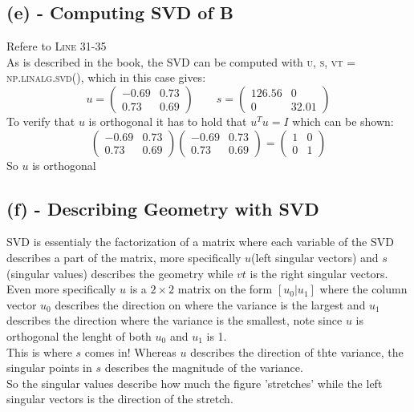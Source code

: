 \documentclass[12pt]{article}
\begin{document}
\subsection*{(e) - Computing SVD of B}
Refere to \textsc{Line 31-35}\\
As is described in the book,  the SVD can be computed with \textsc{u, s, vt = np.linalg.svd()}, which in this case gives:
\[
u = \begin{pmatrix}
   -0.69 & 0.73 \\
    0.73 & 0.69
\end{pmatrix} \qquad s = \begin{pmatrix}
   126.56 & 0 \\
   0 & 32.01
\end{pmatrix}
\]
To verify that $u$ is orthogonal it has to hold that $u^Tu = I$
which can be shown:
\[
\begin{pmatrix}
   -0.69 & 0.73 \\
    0.73 & 0.69
\end{pmatrix}
 \begin{pmatrix}
   -0.69 & 0.73 \\
    0.73 & 0.69
\end{pmatrix} 
= \begin{pmatrix}
   1 & 0 \\
    0 & 1
\end{pmatrix}
\]
So $u$ is orthogonal
\subsection*{(f) - Describing Geometry with SVD}
SVD is essentialy the factorization of a matrix where each variable of the SVD describes a part of the matrix, more specifically $u$(left singular vectors) and $s$(singular values) describes the geometry while $vt$ is the right singular vectors.\\
Even more specifically $u$ is a $2\times2$ matrix on the form $[u_0 | u_1]$ where the column vector $u_0$ describes the direction on where the variance is the largest and $u_1$  describes the direction where the variance is the smallest, note since $u$ is orthogonal the lenght of both $u_0$ and $u_1$ is 1.\\
This is where $s$ comes in! Whereas $u$ describes the direction of thte variance, the singular points in $s$ describes the magnitude of the variance.\\
So the singular values describe how much the figure 'stretches' while the left singular vectors is the direction of the stretch.
\end{document}
